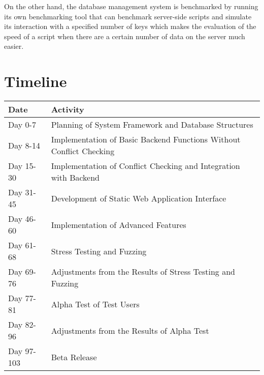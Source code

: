 \documentclass[draft]{sigchi}
\begin{document}
On the other hand, the database management system is benchmarked by running its own benchmarking tool
that can benchmark server-side scripts and simulate its interaction with a specified number of keys which
makes the evaluation of the speed of a script when there are a certain number of data on the server much easier.

\section{Timeline}
\begin{center}
    \begin{tabular}[!htbp]{ | l | p{5cm} |}
    \hline
      Date & Activity \\ \hline
      Day 0-7 & Planning of System Framework and Database Structures \\ \hline
      Day 8-14 & Implementation of Basic Backend Functions Without Conflict Checking \\ \hline
      Day 15-30 & Implementation of Conflict Checking and Integration with Backend \\ \hline
      Day 31-45 & Development of Static Web Application Interface \\ \hline
      Day 46-60 & Implementation of Advanced Features \\ \hline
      Day 61-68 & Stress Testing and Fuzzing \\ \hline
      Day 69-76 & Adjustments from the Results of Stress Testing and Fuzzing \\ \hline
      Day 77-81 & Alpha Test of Test Users \\ \hline
      Day 82-96 & Adjustments from the Results of Alpha Test \\ \hline
      Day 97-103 & Beta Release \\ \hline
    \end{tabular}
\end{center}
\end{document}
